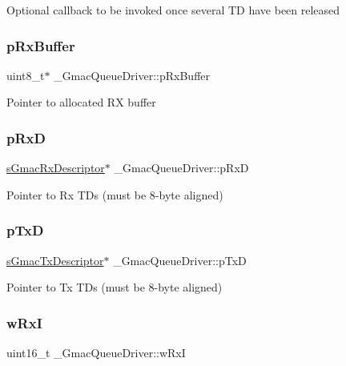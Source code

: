 Optional callback to be invoked once several TD have been released \mbox{\label{struct__GmacQueueDriver_a59f24ea8f745c3de5618eed7b10f6d8e}} 
\subsubsection{\texorpdfstring{pRxBuffer}{pRxBuffer}}
{\footnotesize\ttfamily uint8\+\_\+t$\ast$ \+\_\+\+Gmac\+Queue\+Driver\+::p\+Rx\+Buffer}

Pointer to allocated RX buffer \mbox{\label{struct__GmacQueueDriver_a9f9478c0fcb23fd842b3cadd5d66b4b4}} 
\subsubsection{\texorpdfstring{pRxD}{pRxD}}
{\footnotesize\ttfamily \mbox{\hyperlink{group__gmac__structs_ga60c9fd1b0bff688c6e72c825d088a50b}{s\+Gmac\+Rx\+Descriptor}}$\ast$ \+\_\+\+Gmac\+Queue\+Driver\+::p\+RxD}

Pointer to Rx T\+Ds (must be 8-\/byte aligned) \mbox{\label{struct__GmacQueueDriver_a0c5433d9e853b87ce660278db2d20aed}} 
\subsubsection{\texorpdfstring{pTxD}{pTxD}}
{\footnotesize\ttfamily \mbox{\hyperlink{group__gmac__structs_ga69a2b24578edebf2e816c4d3ca20edeb}{s\+Gmac\+Tx\+Descriptor}}$\ast$ \+\_\+\+Gmac\+Queue\+Driver\+::p\+TxD}

Pointer to Tx T\+Ds (must be 8-\/byte aligned) \mbox{\label{struct__GmacQueueDriver_a6dda1856126e9e770cab7fa81512aa3f}} 
\subsubsection{\texorpdfstring{wRxI}{wRxI}}
{\footnotesize\ttfamily uint16\+\_\+t \+\_\+\+Gmac\+Queue\+Driver\+::w\+RxI}

